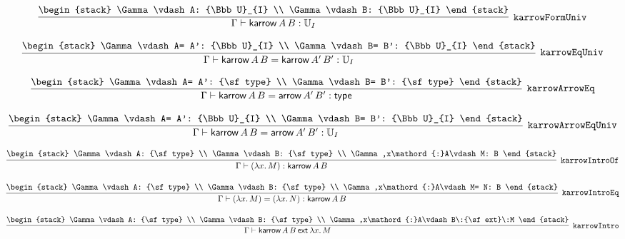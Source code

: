 \[
\infer[{\tt karrowFormUniv}]{\Gamma \vdash {\sf karrow}\,A\,B: {\Bbb U}_{I}}{
\begin{stack}
\Gamma \vdash A: {\Bbb U}_{I}
\\
\Gamma \vdash B: {\Bbb U}_{I}
\end{stack}}
\]

\[
\infer[{\tt karrowEqUniv}]{\Gamma \vdash {\sf karrow}\,A\,B= {\sf karrow}\,A'\,B': {\Bbb U}_{I}}{
\begin{stack}
\Gamma \vdash A= A': {\Bbb U}_{I}
\\
\Gamma \vdash B= B': {\Bbb U}_{I}
\end{stack}}
\]

\[
\infer[{\tt karrowArrowEq}]{\Gamma \vdash {\sf karrow}\,A\,B= {\sf arrow}\,A'\,B': {\sf type}}{
\begin{stack}
\Gamma \vdash A= A': {\sf type}
\\
\Gamma \vdash B= B': {\sf type}
\end{stack}}
\]

\[
\infer[{\tt karrowArrowEqUniv}]{\Gamma \vdash {\sf karrow}\,A\,B= {\sf arrow}\,A'\,B': {\Bbb U}_{I}}{
\begin{stack}
\Gamma \vdash A= A': {\Bbb U}_{I}
\\
\Gamma \vdash B= B': {\Bbb U}_{I}
\end{stack}}
\]

\[
\infer[{\tt karrowIntroOf}]{\Gamma \vdash (\lambda x.\,M): {\sf karrow}\,A\,B}{
\begin{stack}
\Gamma \vdash A: {\sf type}
\\
\Gamma \vdash B: {\sf type}
\\
\Gamma ,x\mathord{:}A\vdash M: B
\end{stack}}
\]

\[
\infer[{\tt karrowIntroEq}]{\Gamma \vdash (\lambda x.\,M)= (\lambda x.\,N): {\sf karrow}\,A\,B}{
\begin{stack}
\Gamma \vdash A: {\sf type}
\\
\Gamma \vdash B: {\sf type}
\\
\Gamma ,x\mathord{:}A\vdash M= N: B
\end{stack}}
\]

\[
\infer[{\tt karrowIntro}]{\Gamma \vdash {\sf karrow}\,A\,B\:{\sf ext}\:\lambda x.\,M}{
\begin{stack}
\Gamma \vdash A: {\sf type}
\\
\Gamma \vdash B: {\sf type}
\\
\Gamma ,x\mathord{:}A\vdash B\:{\sf ext}\:M
\end{stack}}
\]

